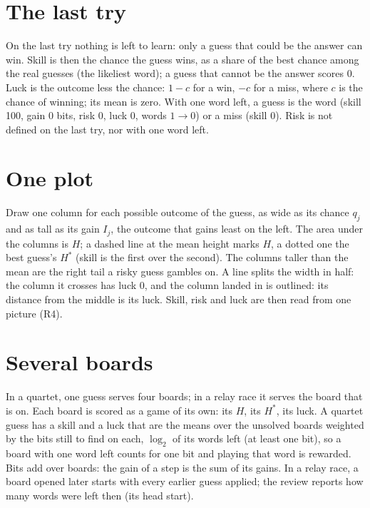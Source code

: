 \documentclass[11pt]{article}
\theoremstyle{definition}
\theoremstyle{remark}
\newcommand{\Gain}{I}
\begin{document}
\section{The last try}\label{sec:last}

On the last try nothing is left to learn: only a guess that could be the answer can
win. Skill is then the chance the guess wins, as a share of the best chance among
the real guesses (the likeliest word); a guess that cannot be the answer scores $0$.
Luck is the outcome less the chance: $1-c$ for a win, $-c$ for a miss, where $c$ is
the chance of winning; its mean is zero. With one word left, a guess is the word
(skill 100, gain $0$ bits, risk $0$, luck $0$, words $1\to0$) or a miss (skill $0$).
Risk is not defined on the last try, nor with one word left.

\section{One plot}\label{sec:plot}

Draw one column for each possible outcome of the guess, as wide as its chance $q_j$ and
as tall as its gain $\Gain_j$, the outcome that gains least on the left. The area under
the columns is $H$; a dashed line at the mean height marks $H$, a dotted one the best
guess's $H^*$ (skill is the first over the second). The columns taller than the mean
are the right tail a risky guess gambles on. A line splits the width in half: the
column it crosses has luck $0$, and the column landed in is outlined: its distance from
the middle is its luck. Skill, risk and luck are then read from one picture (R4).

\section{Several boards}\label{sec:multi}

In a quartet, one guess serves four boards; in a relay race it serves the board that
is on. Each board is scored as a game of its own: its $H$, its $H^*$, its luck. A
quartet guess has a skill and a luck that are the means over the unsolved boards
weighted by the bits still to find on each, $\log_2$ of its words left (at least one
bit), so a board with one word left counts for one bit and playing that word is
rewarded. Bits add over boards: the gain of a step is the sum of its gains. In a relay
race, a board opened later starts with every earlier guess applied; the review reports
how many words were left then (its head start).
\end{document}

